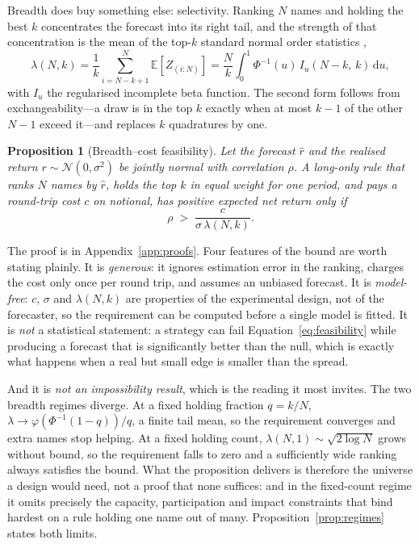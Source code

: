 \documentclass{article}
\theoremstyle{plain}
\newtheorem{proposition}{Proposition}
\theoremstyle{remark}
\begin{document}
Breadth does buy something else: selectivity. Ranking $N$ names and holding the
best $k$ concentrates the forecast into its right tail, and the strength of that
concentration is the mean of the top-$k$ standard normal order statistics
\citep{david2003},
\begin{equation}
\label{eq:lambda}
\lambda(N,k) = \frac{1}{k}\sum_{i=N-k+1}^{N} \mathbb{E}\!\left[Z_{(i:N)}\right]
= \frac{N}{k}\int_0^1 \Phi^{-1}(u)\, I_u(N-k,\,k)\,\mathrm{d}u,
\end{equation}
with $I_u$ the regularised incomplete beta function. The second form follows from
exchangeability---a draw is in the top $k$ exactly when at most $k-1$ of the
other $N-1$ exceed it---and replaces $k$ quadratures by one.

\begin{proposition}[Breadth--cost feasibility]
\label{prop:feasibility}
Let the forecast $\hat r$ and the realised return $r \sim \mathcal{N}(0,\sigma^2)$
be jointly normal with correlation $\rho$. A long-only rule that ranks $N$ names
by $\hat r$, holds the top $k$ in equal weight for one period, and pays a
round-trip cost $c$ on notional, has positive expected net return only if
\begin{equation}
\label{eq:feasibility}
\rho \;>\; \frac{c}{\sigma\,\lambda(N,k)}.
\end{equation}
\end{proposition}

The proof is in Appendix~\ref{app:proofs}. Four features of the bound are worth
stating plainly. It is \emph{generous}: it ignores estimation error in the
ranking, charges the cost only once per round trip, and assumes an unbiased
forecast. It is \emph{model-free}: $c$, $\sigma$ and $\lambda(N,k)$ are
properties of the experimental design, not of the forecaster, so the requirement
can be computed before a single model is fitted. It is \emph{not} a statistical
statement: a strategy can fail Equation~\ref{eq:feasibility} while producing a
forecast that is significantly better than the null, which is exactly what
happens when a real but small edge is smaller than the spread.

And it is \emph{not an impossibility result}, which is the reading it most
invites. The two breadth regimes diverge. At a fixed holding fraction $q = k/N$,
$\lambda \to \varphi(\Phi^{-1}(1-q))/q$, a finite tail mean, so the
requirement converges and extra names stop helping. At a fixed holding count,
$\lambda(N,1) \sim \sqrt{2\log N}$ grows without bound, so the requirement
falls to zero and a sufficiently wide ranking always satisfies the bound. What
the proposition delivers is therefore the universe a design would need, not a
proof that none suffices: and in the fixed-count regime it omits precisely the
capacity, participation and impact constraints that bind hardest on a rule
holding one name out of many. Proposition~\ref{prop:regimes} states both limits.
\end{document}
